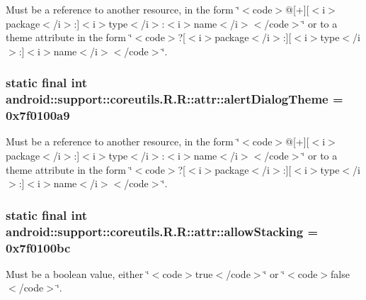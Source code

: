 Must be a reference to another resource, in the form \char`\"{}$<$code$>$@\mbox{[}+\mbox{]}\mbox{[}$<$i$>$package$<$/i$>$:\mbox{]}$<$i$>$type$<$/i$>$:$<$i$>$name$<$/i$>$$<$/code$>$\char`\"{} or to a theme attribute in the form \char`\"{}$<$code$>$?\mbox{[}$<$i$>$package$<$/i$>$:\mbox{]}\mbox{[}$<$i$>$type$<$/i$>$:\mbox{]}$<$i$>$name$<$/i$>$$<$/code$>$\char`\"{}. \hypertarget{classandroid_1_1support_1_1coreutils_1_1_r_1_1attr_ca699b939b3e164d72fa2346a6b005f3}{
\subsubsection[{alertDialogTheme}]{\setlength{\rightskip}{0pt plus 5cm}static final int android::support::coreutils.R.R::attr::alertDialogTheme = 0x7f0100a9}}
\label{classandroid_1_1support_1_1coreutils_1_1_r_1_1attr_ca699b939b3e164d72fa2346a6b005f3}


Must be a reference to another resource, in the form \char`\"{}$<$code$>$@\mbox{[}+\mbox{]}\mbox{[}$<$i$>$package$<$/i$>$:\mbox{]}$<$i$>$type$<$/i$>$:$<$i$>$name$<$/i$>$$<$/code$>$\char`\"{} or to a theme attribute in the form \char`\"{}$<$code$>$?\mbox{[}$<$i$>$package$<$/i$>$:\mbox{]}\mbox{[}$<$i$>$type$<$/i$>$:\mbox{]}$<$i$>$name$<$/i$>$$<$/code$>$\char`\"{}. \hypertarget{classandroid_1_1support_1_1coreutils_1_1_r_1_1attr_25a894b7fd153d96d7815e4648f0687b}{
\subsubsection[{allowStacking}]{\setlength{\rightskip}{0pt plus 5cm}static final int android::support::coreutils.R.R::attr::allowStacking = 0x7f0100bc}}
\label{classandroid_1_1support_1_1coreutils_1_1_r_1_1attr_25a894b7fd153d96d7815e4648f0687b}


Must be a boolean value, either \char`\"{}$<$code$>$true$<$/code$>$\char`\"{} or \char`\"{}$<$code$>$false$<$/code$>$\char`\"{}. 

